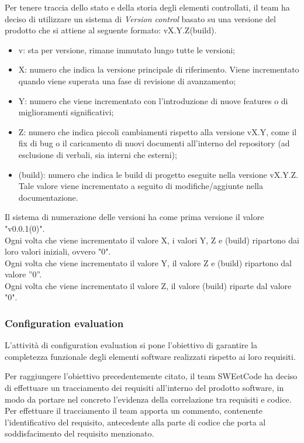 \documentclass[10pt, a4paper]{article}
\begin{document}
\label{sec:version}
Per tenere traccia dello stato e della storia degli elementi controllati, il team ha deciso di utilizzare un sistema di \textit{Version control} basato su una versione 
del prodotto che si attiene al seguente formato: vX.Y.Z(build).
\begin{itemize}
    \item v: sta per versione, rimane immutato lungo tutte le versioni;
    \item X: numero che indica la versione principale di riferimento. Viene incrementato quando viene superata una fase di revisione di avanzamento;
    \item Y: numero che viene incrementato con l'introduzione di nuove features o di miglioramenti significativi;
    \item Z:  numero che indica piccoli cambiamenti rispetto alla versione vX.Y, come il fix di bug o il caricamento di nuovi documenti all'interno del repository (ad esclusione di verbali, sia interni che esterni);
    \item (build): numero che indica le build di progetto eseguite nella versione vX.Y.Z. Tale valore viene incrementato a seguito di modifiche/aggiunte nella documentazione.
\end{itemize}
Il sistema di numerazione delle versioni ha come prima versione il valore "v0.0.1(0)".\\
Ogni volta che viene incrementato il valore X, i valori Y, Z e (build) ripartono dai loro valori iniziali, ovvero "0".\\
Ogni volta che viene incrementato il valore Y, il valore Z e (build) ripartono dal valore ”0”.\\
Ogni volta che viene incrementato il valore Z, il valore (build) riparte dal valore "0".

\subsubsection{Configuration evaluation}
L'attività di configuration evaluation si pone l'obiettivo di garantire la completezza funzionale degli elementi software realizzati rispetto ai loro
requisiti.

Per raggiungere l'obiettivo precedentemente citato, il team SWEetCode ha deciso di effettuare un tracciamento dei requisiti all'interno del prodotto software,
in modo da portare nel concreto l'evidenza della correlazione tra requisiti e codice.\\
Per effettuare il tracciamento il team apporta un commento, contenente l'identificativo del requisito, antecedente alla parte di codice che porta al soddisfacimento
del requisito menzionato.
\end{document}

